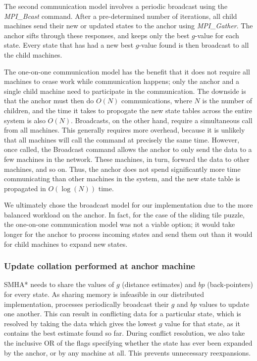 \documentclass[11pt]{article}
\begin{document}
{The second communication model involves a periodic broadcast using the \emph{MPI\_Bcast} command. After a pre-determined number of iterations, all child machines send their new or updated states to the anchor using \emph{MPI\_Gather}. The anchor sifts through these responses, and keeps only the best $g$-value for each state. Every state that has had a new best $g$-value found is then broadcast to all the child machines.

The one-on-one communication model has the benefit that it does not require all machines to cease work while communication happens; only the anchor and a single child machine need to participate in the communication. The downside is that the anchor must then do $O(N)$ communications, where $N$ is the number of children, and the time it takes to propogate the new state tables across the entire system is also $O(N)$. Broadcasts, on the other hand, require a simultaneous call from all machines. This generally requires more overhead, because it is unlikely that all machines will call the command at precisely the same time. However, once called, the Broadcast command allows the anchor to only send the data to a few machines in the network. These machines, in turn, forward the data to other machines, and so on. Thus, the anchor does not spend significantly more time communicating than other machines in the system, and the new state table is propagated in $O(\log(N))$ time.

We ultimately chose the broadcast model for our implementation due to the more balanced workload on the anchor. In fact, for the case of the sliding tile puzzle, the one-on-one communication model was not a viable option; it would take longer for the anchor to process incoming states and send them out than it would for child machines to expand new states.

\subsubsection*{Update collation performed at anchor machine}

SMHA* needs to share the values of $g$ (distance estimates) and $bp$ (back-pointers) for every state. As sharing memory is infeasible in our distributed implementation, processes periodically broadcast their $g$ and $bp$ values to update one another. This can result in conflicting data for a particular state, which is resolved by taking the data which gives the lowest $g$ value for that state, as it contains the best estimate found so far. During conflict resolution, we also take the inclusive OR of the flags specifying whether the state has ever been expanded by the anchor, or by any machine at all. This prevents unnecessary reexpansions.

}
\end{document}
